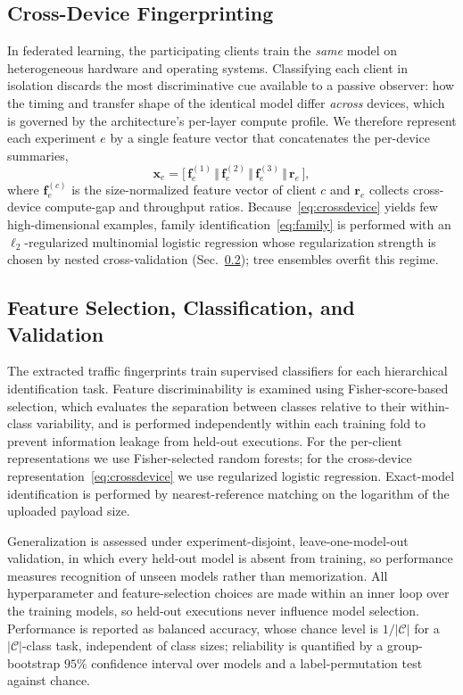 \subsection{Cross-Device Fingerprinting}
\label{subsec:crossdevice}
In federated learning, the participating clients train the \emph{same} model on
heterogeneous hardware and operating systems. Classifying each client in isolation discards the most
discriminative cue available to a passive observer: how the timing and transfer
shape of the identical model differ \emph{across} devices, which is governed by
the architecture's per-layer compute profile. We therefore represent each
experiment $e$ by a single feature vector that concatenates the per-device
summaries,
\begin{equation}
\mathbf{x}_e =
\big[\,
\mathbf{f}^{(1)}_{e} \,\Vert\,
\mathbf{f}^{(2)}_{e} \,\Vert\,
\mathbf{f}^{(3)}_{e} \,\Vert\,
\mathbf{r}_e
\,\big],
\label{eq:crossdevice}
\end{equation}
where $\mathbf{f}^{(c)}_{e}$ is the size-normalized feature vector of client $c$
and $\mathbf{r}_e$ collects cross-device compute-gap and throughput ratios.
Because~\eqref{eq:crossdevice} yields few high-dimensional examples, family
identification~\eqref{eq:family} is performed with an $\ell_2$-regularized
multinomial logistic regression whose regularization strength is chosen by
nested cross-validation (Sec.~\ref{subsec:classification}); tree ensembles
overfit this regime.

\subsection{Feature Selection, Classification, and Validation}
\label{subsec:classification}
The extracted traffic fingerprints train supervised classifiers for each
hierarchical identification task. Feature discriminability is examined using
Fisher-score-based selection, which evaluates the separation between classes
relative to their within-class variability, and is performed independently
within each training fold to prevent information leakage from held-out
executions. For the per-client representations we use Fisher-selected random
forests; for the cross-device representation~\eqref{eq:crossdevice} we use
regularized logistic regression. Exact-model identification is performed by
nearest-reference matching on the logarithm of the uploaded payload size.

Generalization is assessed under experiment-disjoint, leave-one-model-out
validation, in which every held-out model is absent from training, so
performance measures recognition of unseen models rather than memorization. All
hyperparameter and feature-selection choices are made within an inner loop over
the training models, so held-out executions never influence model selection.
Performance is reported as balanced accuracy, whose chance level is
$1/|\mathcal{C}|$ for a $|\mathcal{C}|$-class task, independent of class sizes;
reliability is quantified by a group-bootstrap $95\%$ confidence interval over
models and a label-permutation test against chance.

